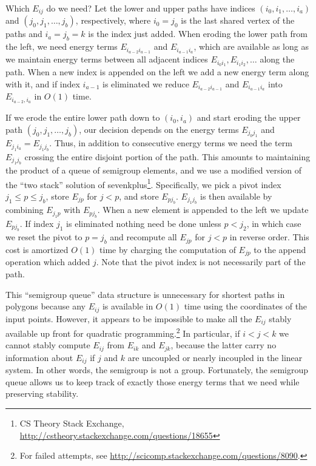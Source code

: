 \documentclass[11pt]{article}
\begin{document}
Which $E_{ij}$ do we need?  Let the lower and upper paths have indices $(i_0, i_1, \ldots, i_a)$ and $(j_0, j_1, \ldots, j_b)$, respectively, where $i_0 = j_0$ is the last shared vertex of the paths
and $i_a = j_b = k$ is the index just added.  When eroding the lower path from the left, we need energy terms $E_{i_{a-2}i_{a-1}}$ and $E_{i_{a-1}i_{a}}$, which are available as long as we maintain
energy terms between all adjacent indices $E_{i_0i_1}, E_{i_1i_2}, \ldots$ along the path.  When a new index is appended on the left we add a new energy term along with it, and if index $i_{a-1}$ is
eliminated we reduce $E_{i_{a-2}i_{a-1}}$ and $E_{i_{a-1}i_{a}}$ into $E_{i_{a-2},i_a}$ in $O(1)$ time.

If we erode the entire lower path down to $(i_0,i_a)$ and start eroding the upper path $(j_0, j_1, \ldots, j_b)$, our decision depends on the energy terms $E_{j_0j_1}$ and $E_{j_1i_a} = E_{j_1j_b}$.
Thus, in addition to consecutive energy terms we need the term $E_{j_1j_b}$ crossing the entire disjoint portion of the path.  This amounts to maintaining the product of a queue of semigroup elements,
and we use a modified version of the ``two stack'' solution of sevenkplus\footnote{CS Theory Stack Exchange, \url{http://cstheory.stackexchange.com/questions/18655}}.  Specifically, we pick a pivot
index $j_1 \le p \le j_b$, store $E_{j p}$ for $j < p$, and store $E_{p j_b}$.  $E_{j_1 j_b}$ is then available by combining $E_{j_1 p}$ with $E_{p j_b}$.  When a new element is appended to the left
we update $E_{p j_b}$.  If index $j_1$ is eliminated nothing need be done unless $p < j_2$, in which case we reset the pivot to $p = j_b$ and recompute all $E_{j p}$ for $j < p$ in reverse order.
This cost is amortized $O(1)$ time by charging the computation of $E_{j p}$ to the append operation which added $j$.  Note that the pivot index is not necessarily part of the path.

This ``semigroup queue'' data structure is unnecessary for shortest paths in polygons because any $E_{ij}$ is available in $O(1)$ time using the coordinates of the input points.  However,
it appears to be impossible to make all the $E_{ij}$ stably available up front for quadratic programming.\footnote{For failed attempts, see \url{http://scicomp.stackexchange.com/questions/8090}.}
In particular, if $i < j < k$ we cannot stably compute $E_{ij}$ from $E_{ik}$ and $E_{jk}$, because the latter
carry no information about $E_{ij}$ if $j$ and $k$ are uncoupled or nearly incoupled in the linear system.  In other words, the semigroup is not a group.
Fortunately, the semigroup queue allows us to keep track of exactly those energy terms that we need while preserving stability.
\end{document}
